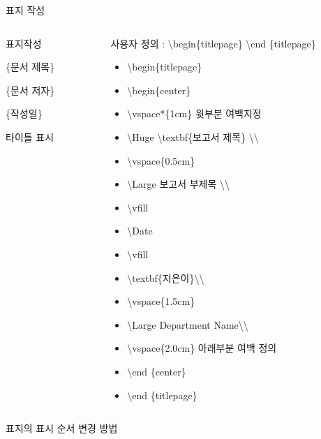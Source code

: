 \documentclass[ aspectratio=149,  14pt,blue,xcolor=pdftex,dvipsnames,table,handout,notes]{beamer}
\begin{document}
		\begin{frame}[t,shrink=10]{표지 작성}


			\begin{columns}[t]
			\begin{column}{.4\textwidth}
					\begin{block} {표지작성}
					\begin{description}[1234567890]
					\item [\textbackslash title] 	\{문서 제목\}
					\item [\textbackslash author]	\{문서 저자\}
					\item [\textbackslash date] 	\{작성일\}
					\item []
					\item [\textbackslash maketitle] 타이틀 표시
					\end{description}
					\end{block}
			\end{column}

			\begin{column}{.6\textwidth}
					\begin{block} {사용자 정의 : \textbackslash begin\{titlepage\} \textbackslash end \{titlepage\} }
					\begin{itemize}
					\item []\textbackslash begin\{titlepage\}
					\item []\textbackslash begin\{center\}
					\item []\textbackslash vspace*\{1cm\}  윗부분 여백지정
					\item []\textbackslash Huge \textbackslash textbf\{보고서 제목\} \textbackslash \textbackslash 
					\item []\textbackslash vspace\{0.5cm\}
					\item []\textbackslash Large 보고서 부제목 \textbackslash \textbackslash 
					\item []\textbackslash vfill
					\item []\textbackslash Date
					\item []\textbackslash vfill
					\item []\textbackslash textbf\{지은이\}\textbackslash \textbackslash 
					\item []\textbackslash vspace\{1.5cm\}
					\item []\textbackslash Large Department Name\textbackslash \textbackslash 
					\item []\textbackslash vspace\{2.0cm\}  아래부분 여백 정의
					\item []\textbackslash end \{center\}
					\item []\textbackslash end \{titlepage\}
					\end{itemize}
					\end{block}
			\end{column}
			\end{columns}



		표지의 표시 순서 변경 방법
		\end{frame}
\end{document}
